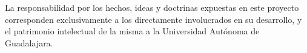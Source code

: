 
La responsabilidad por los hechos, ideas y doctrinas expuestas en este proyecto corresponden
exclusivamente a los directamente involucrados en su desarrollo, y el patrimonio intelectual de la
misma a la Universidad Autónoma de Guadalajara.
